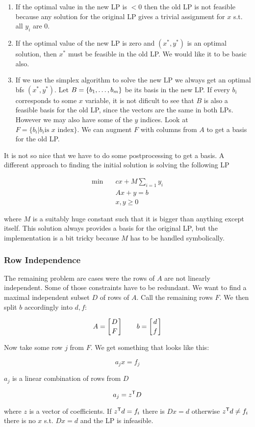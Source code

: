 \begin{enumerate}
\item If the optimal value in the new LP is $<0$ then the old LP is not feasible because any solution for the original LP gives a trivial assignment for $x$ s.t. all $y_i$ are 0.
\item If the optimal value of the new LP is zero and $(x^*, y^*)$ is an optimal solution, then $x^*$ must be feasible in the old LP. We would like it to be basic also.
\item If we use the simplex algorithm to solve the new LP we always get an optimal bfs $(x^*,y^*)$. Let $B=\{{b}_1,\ldots,{b}_{m}\}$ be its basis in the new LP. If every $b_i$ corresponds to some $x$ variable, it is not dificult to see that $B$ is also a feasible basis for the old LP, since the vectors are the same in both LPs. However we may also have some of the $y$ indices. Look at $F=\{b_i | b_i \text{is $x$ index}\}$. We can augment $F$ with columns from $A$ to get a basis for the old LP.
\end{enumerate}

It is not so nice that we have to do some postprocessing to get a basis. A different approach to finding the initial solution is solving the following LP

\begin{align*}
\min \quad & cx + M\sum_{i=1} y_i\\
&Ax+y=b\\
&x,y\geq 0
\end{align*}

where $M$ is a suitably huge constant such that it is bigger than anything except itself. This solution always provides a basis for the original LP, but the implementation is a bit tricky because $M$ has to be handled symbolically.

\subsubsection*{Row Independence}

The remaining problem are cases were the rows of $A$ are not linearly independent. Some of those constraints have to be redundant. We want to find a maximal independent subset $D$ of rows of $A$. Call the remaining rows $F$. We then split $b$ accordingly into $d,f$:

\[A=\left[ D \atop F\right] \qquad b = \left[d\atop f\right]\]

Now take some row $j$ from $F$. We get something that looks like this:

\[a_jx=f_j\]

$a_j$ is a linear combination of rows from $D$

\[a_j={z}^\text{\upshape \sffamily T} D\]

where $z$ is a vector of coefficients. If ${z}^\text{\upshape \sffamily T} d = f_i$ there is $Dx=d$ otherwise ${z}^\text{\upshape \sffamily T} d \neq f_i$ there is no $x$ s.t. $Dx=d$ and the LP is infeasible.
